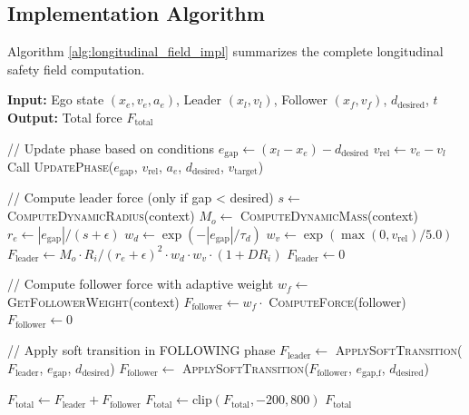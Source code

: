 \documentclass[12pt,a4paper,oneside]{report}
\begin{document}
\subsection{Implementation Algorithm}

Algorithm \ref{alg:longitudinal_field_impl} summarizes the complete longitudinal safety field computation.

\begin{algorithm}[H]
\caption{Bidirectional Longitudinal Safety Field with Phase Detection}
\label{alg:longitudinal_field_impl}
\begin{algorithmic}[1]
\State \textbf{Input:} Ego state $(x_e, v_e, a_e)$, Leader $(x_l, v_l)$, Follower $(x_f, v_f)$, $d_{\text{desired}}$, $t$
\State \textbf{Output:} Total force $F_{\text{total}}$

\State // Update phase based on conditions
\State $e_{\text{gap}} \gets (x_l - x_e) - d_{\text{desired}}$
\State $v_{\text{rel}} \gets v_e - v_l$
\State Call \textsc{UpdatePhase}($e_{\text{gap}}$, $v_{\text{rel}}$, $a_e$, $d_{\text{desired}}$, $v_{\text{target}}$)

\State // Compute leader force (only if gap < desired)
    \State $s \gets$ \textsc{ComputeDynamicRadius}(context)
    \State $M_o \gets$ \textsc{ComputeDynamicMass}(context)
    \State $r_e \gets |e_{\text{gap}}| / (s + \epsilon)$
    \State $w_d \gets \exp(-|e_{\text{gap}}| / \tau_d)$
    \State $w_v \gets \exp(\max(0, v_{\text{rel}}) / 5.0)$
    \State $F_{\text{leader}} \gets M_o \cdot R_i / (r_e + \epsilon)^2 \cdot w_d \cdot w_v \cdot (1 + DR_i)$
\Else
    \State $F_{\text{leader}} \gets 0$ 
\EndIf

\State // Compute follower force with adaptive weight
    \State $w_f \gets$ \textsc{GetFollowerWeight}(context)
    \State $F_{\text{follower}} \gets w_f \cdot$ \textsc{ComputeForce}(follower)
\Else
    \State $F_{\text{follower}} \gets 0$
\EndIf

\State // Apply soft transition in FOLLOWING phase
    \State $F_{\text{leader}} \gets$ \textsc{ApplySoftTransition}($F_{\text{leader}}$, $e_{\text{gap}}$, $d_{\text{desired}}$)
    \State $F_{\text{follower}} \gets$ \textsc{ApplySoftTransition}($F_{\text{follower}}$, $e_{\text{gap,f}}$, $d_{\text{desired}}$)
\EndIf

\State $F_{\text{total}} \gets F_{\text{leader}} + F_{\text{follower}}$
\State $F_{\text{total}} \gets \text{clip}(F_{\text{total}}, -200, 800)$
\State \Return $F_{\text{total}}$
\end{algorithmic}
\end{algorithm}
\end{document}
